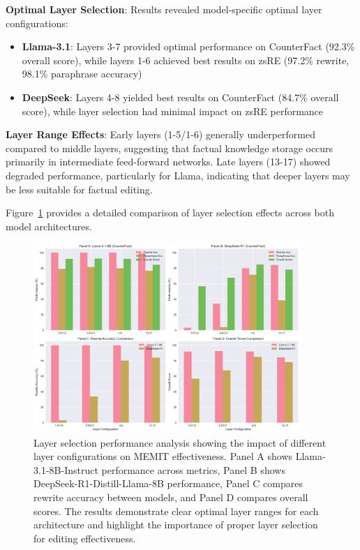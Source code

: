 \textbf{Optimal Layer Selection}: Results revealed model-specific optimal layer configurations:

\begin{itemize}
    \item \textbf{Llama-3.1}: Layers 3-7 provided optimal performance on CounterFact (92.3\% overall score), while layers 1-6 achieved best results on zsRE (97.2\% rewrite, 98.1\% paraphrase accuracy)
    \item \textbf{DeepSeek}: Layers 4-8 yielded best results on CounterFact (84.7\% overall score), while layer selection had minimal impact on zsRE performance
\end{itemize}

\textbf{Layer Range Effects}: Early layers (1-5/1-6) generally underperformed compared to middle layers, suggesting that factual knowledge storage occurs primarily in intermediate feed-forward networks. Late layers (13-17) showed degraded performance, particularly for Llama, indicating that deeper layers may be less suitable for factual editing.

Figure~\ref{fig:layer_comparison} provides a detailed comparison of layer selection effects across both model architectures.

\begin{figure}[H]
\centering
\includegraphics[width=0.9\textwidth]{figures/layer_comparison.png}
\caption[Layer Selection Performance Analysis]{Layer selection performance analysis showing the impact of different layer configurations on MEMIT effectiveness. Panel A shows Llama-3.1-8B-Instruct performance across metrics, Panel B shows DeepSeek-R1-Distill-Llama-8B performance, Panel C compares rewrite accuracy between models, and Panel D compares overall scores. The results demonstrate clear optimal layer ranges for each architecture and highlight the importance of proper layer selection for editing effectiveness.}
\label{fig:layer_comparison}
\end{figure}


